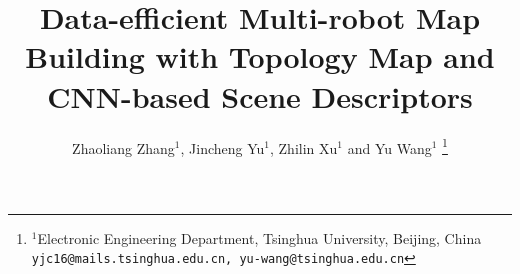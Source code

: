 \documentclass[letterpaper, 10 pt, conference]{ieeeconf}  %
\title{\LARGE \bf
Data-efficient Multi-robot Map Building with Topology Map and CNN-based Scene Descriptors
}
\author{ Zhaoliang Zhang$^{1}$, Jincheng Yu$^{1}$, Zhilin Xu$^{1}$ and Yu Wang$^{1}$ %
\thanks{$^{1}$Electronic Engineering Department,
        Tsinghua University, Beijing, China
        {\tt\small yjc16@mails.tsinghua.edu.cn, yu-wang@tsinghua.edu.cn}}%
}
\begin{document}
\maketitle
\thispagestyle{empty}
\pagestyle{empty}


\begin{abstract}

\end{abstract}



% 
% 
\end{document}
